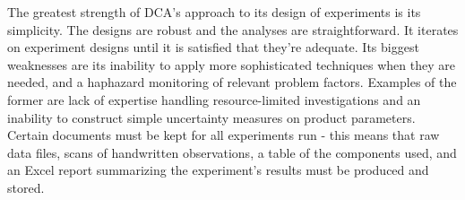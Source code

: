 \documentclass[11pt,a4paper,article]{memoir} %
\begin{document}
The greatest strength of DCA's approach to its design of experiments is its simplicity. The designs are robust and the analyses are straightforward. It iterates on experiment designs until it is satisfied that they're adequate. Its biggest weaknesses are its inability to apply more sophisticated techniques when they are needed, and a haphazard monitoring of relevant problem factors. Examples of the former are lack of expertise handling resource-limited investigations and an inability to construct simple uncertainty measures on product parameters.
Certain documents must be kept for all experiments run - this means that raw data files, scans of handwritten observations, a table of the components used, and an Excel report summarizing the experiment's results must be produced and stored.
\par

\end{document}
